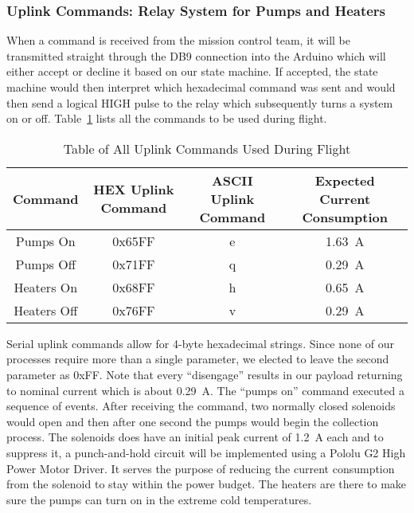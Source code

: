 \subsubsection{Uplink Commands: Relay System for Pumps and Heaters}

When a command is received from the mission control team, it will be transmitted straight through the DB9 connection into the Arduino which will either accept or decline it based on our state machine.  If accepted, the state machine would then interpret which hexadecimal command was sent and would then send a logical HIGH pulse to the relay which subsequently turns a system on or off.  Table~\ref{tab:All-Commands} lists all the commands to be used during flight.

\begin{table}[!ht]
\centering
\caption{Table of All Uplink Commands Used During Flight} 
\label{tab:All-Commands}
\bigskip
\begin{tabular}{|c|c|c|c|}
\hline
\multicolumn{1}{|c|}{\bfseries Command} & \multicolumn{1}{c|}{\bfseries HEX Uplink Command} &  \multicolumn{1}{c|}{\bfseries ASCII Uplink Command} & \multicolumn{1}{c|}{\bfseries Expected Current Consumption} \\
\hline
    Pumps On     	& 0x65FF 	& e	 & \SI{1.63}{\ampere}   \\ \hline %
    Pumps Off    	& 0x71FF 	& q	 & \SI{0.29}{\ampere}    \\ \hline
    Heaters On  	& 0x68FF 	& h	 & \SI{0.65}{\ampere}    \\ \hline %
    Heaters Off 	& 0x76FF 	& v	 & \SI{0.29}{\ampere}    \\ \hline
\end{tabular}
\medskip
\end{table}

Serial uplink commands allow for 4-byte hexadecimal strings.  Since none of our processes require more than a single parameter, we elected to leave the second parameter as 0xFF.  Note that every ``disengage'' results in our payload returning to nominal current which is about \SI{0.29}{\ampere}.  The ``pumps on'' command executed a sequence of events. After receiving the command, two normally closed solenoids would open and then after one second the pumps would begin the collection process.  The solenoids does have an initial peak current of \SI{1.2}{\ampere} each and to suppress it, a punch-and-hold circuit will be implemented using a Pololu G2 High Power Motor Driver.  It serves the purpose of reducing the current consumption from the solenoid to stay within the power budget.  The heaters are there to make sure the pumps can turn on in the extreme cold temperatures.  

